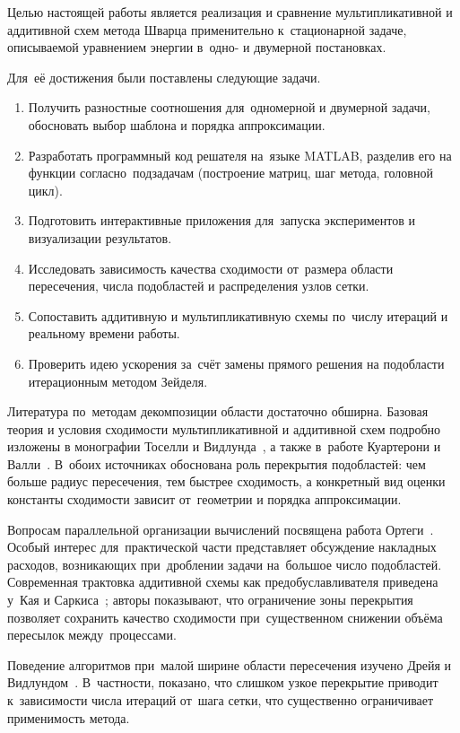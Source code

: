 Целью настоящей работы является реализация и сравнение мультипликативной и
аддитивной схем метода Шварца применительно к~стационарной задаче, описываемой
уравнением энергии в~одно- и двумерной постановках.

Для~её достижения были поставлены следующие задачи.
\begin{enumerate}
	\item Получить разностные соотношения для~одномерной и двумерной задачи,
	      обосновать выбор шаблона и порядка аппроксимации.
	\item Разработать программный код решателя на~языке MATLAB, разделив его на
	      функции согласно~подзадачам (построение матриц, шаг метода, головной цикл).
	\item Подготовить интерактивные приложения для~запуска экспериментов и
	      визуализации результатов.
	\item Исследовать зависимость качества сходимости от~размера области
	      пересечения, числа подобластей и распределения узлов сетки.
	\item Сопоставить аддитивную и мультипликативную схемы по~числу итераций
	      и реальному времени работы.
	\item Проверить идею ускорения за~счёт замены прямого решения на
	      подобласти итерационным методом Зейделя.
\end{enumerate}

Литература по~методам декомпозиции области достаточно обширна. Базовая теория
и условия сходимости мультипликативной и аддитивной схем подробно изложены в
монографии Тоселли и Видлунда~\cite{toselli2005}, а также в~работе Куартерони и
Валли~\cite{quarteroni1999}. В~обоих источниках обоснована роль перекрытия
подобластей: чем больше радиус пересечения, тем быстрее сходимость, а
конкретный вид оценки константы сходимости зависит от~геометрии и порядка
аппроксимации.

Вопросам параллельной организации вычислений посвящена работа
Ортеги~\cite{ortega1991}. Особый интерес для~практической части представляет
обсуждение накладных расходов, возникающих при~дроблении задачи на~большое
число подобластей. Современная трактовка аддитивной схемы как
предобуславливателя приведена у~Кая и Саркиса~\cite{cai1999}; авторы
показывают, что ограничение зоны перекрытия позволяет сохранить качество
сходимости при~существенном снижении объёма пересылок между~процессами.

Поведение алгоритмов при~малой ширине области пересечения изучено Дрейя и
Видлундом~\cite{dryja1994}. В~частности, показано, что слишком узкое
перекрытие приводит к~зависимости числа итераций от~шага сетки, что
существенно ограничивает применимость метода.

